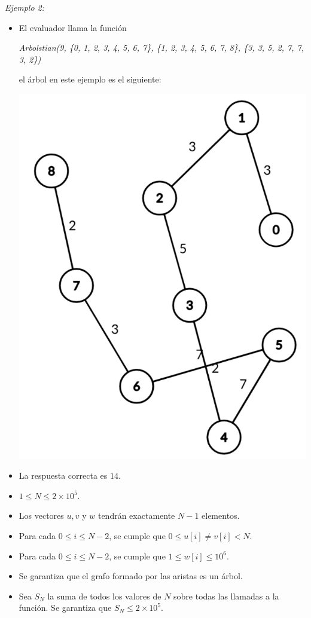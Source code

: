 \documentclass[12pt]{scrartcl}
\begin{document}
        {\itshape Ejemplo 2:}
        \begin{itemize}
            \item El evaluador llama la función 
            \begin{center}
                \textit{Arbolstian(9, \{0, 1, 2, 3, 4, 5, 6, 7\}, \{1, 2, 3, 4, 5, 6, 7, 8\}, \{3, 3, 5, 2, 7, 7, 3, 2\})}
            \end{center}
            el árbol en este ejemplo es el siguiente:
            \begin{center}
                \includegraphics[scale=0.2]{ej2.png}
            \end{center}
            \item La respuesta correcta es $14$.
        \end{itemize}
        

        \begin{itemize}
            \item $1 \le N \le 2\times10^5$.
            \item Los vectores $u, v$ y $w$ tendrán exactamente $N - 1$ elementos.
            \item Para cada $0 \le i \le N - 2$, se cumple que $0 \le u[i] \neq v[i] < N$. 
            \item Para cada $0 \le i \le N - 2$, se cumple que $1 \le w[i] \le 10^6$.
            \item Se garantiza que el grafo formado por las aristas es un árbol.
            \item Sea $S_N$ la suma de todos los valores de $N$ sobre todas las llamadas a la función. Se garantiza que $S_N \le 2\times 10^5$.
        \end{itemize}
    
\end{document}

